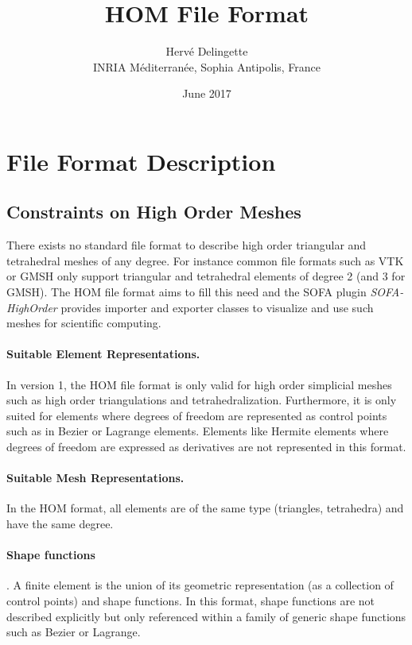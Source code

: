 \documentclass[a4paper,11pt]{article}
\title{HOM File Format}
\date{June 2017}
\author{Herv\'e Delingette\\ {\small INRIA M\'editerran\'ee, Sophia Antipolis, France}}
\begin{document}
 
\maketitle

\section{File Format Description}

\subsection{Constraints on High Order Meshes}

There exists no standard file format to describe high order triangular and tetrahedral meshes of any degree. For instance common file formats such as VTK or GMSH only support triangular and tetrahedral elements of degree 2 (and 3 for GMSH).
The HOM file format aims to fill this need and the SOFA plugin {\em SOFA-HighOrder} provides importer and exporter classes to visualize and use such meshes for scientific computing.

\paragraph{Suitable Element Representations.} In version 1, the HOM file format is only valid for high order simplicial meshes such as high order triangulations and tetrahedralization.  Furthermore, it is only suited for elements where degrees of freedom are represented as control points such as in Bezier or Lagrange elements. Elements like Hermite elements where degrees of freedom are expressed as derivatives are not represented in this format.

\paragraph{Suitable Mesh Representations.} In the HOM format, all elements are of the same type (triangles, tetrahedra) and have the same degree.

\paragraph{Shape functions}. A finite element is the union of its geometric representation (as a collection of control points) and shape functions. In this format, shape functions are not described explicitly but only referenced within a family of generic shape functions such as Bezier or Lagrange.
\end{document}
